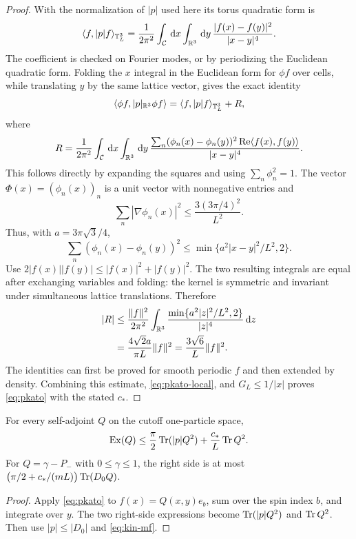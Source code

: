 \begin{proof}
With the normalization of $|p|$ used here its torus quadratic form is
\begin{equation}
 \langle f,|p|f\rangle_{\mathbb T_L^3}
 =\frac1{2\pi^2}\int_{\mathcal C}\,\mathrm d x\int_{\mathbb R^3}\,\mathrm d y\,
            \frac{|f(x)-f(y)|^2}{|x-y|^4}.
 \label{eq:torus-half-laplacian}
\end{equation}
The coefficient is checked on Fourier modes, or by periodizing the
Euclidean quadratic form.  Folding the $x$ integral in the Euclidean form
for $\phi f$ over cells, while translating $y$ by the same lattice vector,
gives the exact identity
\[
 \langle\phi f,|p|_{\mathbb R^3}\phi f\rangle
 =\langle f,|p|f\rangle_{\mathbb T_L^3}+R,
\]
where
\[
 R=\frac1{2\pi^2}\int_{\mathcal C}\,\mathrm d x\int_{\mathbb R^3}\,\mathrm d y\,
 \frac{\sum_n(\phi_n(x)-\phi_n(y))^2
             \operatorname{Re}\langle f(x),f(y)\rangle}{|x-y|^4}.
\]
This follows directly by expanding the squares and using
$\sum_n\phi_n^2=1$.  The vector $\Phi(x)=(\phi_n(x))_n$ is a unit vector
with nonnegative entries and
\[
 \sum_n|\nabla\phi_n(x)|^2\le\frac{3(3\pi/4)^2}{L^2}.
\]
Thus, with $a=3\pi\sqrt3/4$,
\[
 \sum_n(\phi_n(x)-\phi_n(y))^2
 \le\min\{a^2|x-y|^2/L^2,2\}.
\]
Use $2|f(x)||f(y)|\le|f(x)|^2+|f(y)|^2$.  The two resulting integrals
are equal after exchanging variables and folding: the kernel is symmetric
and invariant under simultaneous lattice translations.  Therefore
\begin{align*}
 |R|&\le\frac{\|f\|^2}{2\pi^2}
       \int_{\mathbb R^3}\frac{\min\{a^2|z|^2/L^2,2\}}{|z|^4}\,\mathrm d z\\
 &=\frac{4\sqrt2a}{\pi L}\|f\|^2
  =\frac{3\sqrt6}{L}\|f\|^2.
\end{align*}
The identities can first be proved for smooth periodic $f$ and then extended
by density.  Combining this estimate, \eqref{eq:pkato-local}, and
$G_L\le1/|x|$ proves \eqref{eq:pkato} with the stated $c_*$.
\end{proof}

\begin{corollary}
\label{cor:exchange}
For every self-adjoint $Q$ on the cutoff one-particle space,
\begin{equation}
 \mathrm{Ex}(Q)
 \le\frac\pi2\operatorname{Tr}(|p|Q^2)+\frac{c_*}{L}\operatorname{Tr} Q^2.
 \label{eq:exchange}
\end{equation}
For $Q=\gamma-P_-$ with $0\le\gamma\le1$, the right side is at most
$\bigl(\pi/2+c_*/(mL)\bigr)\operatorname{Tr}(D_0Q)$.
\end{corollary}
\begin{proof}
Apply \eqref{eq:pkato} to $f(x)=Q(x,y)e_b$, sum over the spin index $b$,
and integrate over $y$.  The two right-side expressions become
$\operatorname{Tr}(|p|Q^2)$ and $\operatorname{Tr} Q^2$.  Then use $|p|\le|D_0|$ and
\eqref{eq:kin-mf}.
\end{proof}

